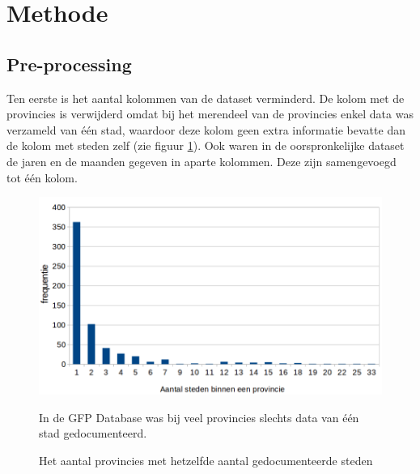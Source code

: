 \documentclass{article}
\begin{document}
\newpage

\section*{Methode}

\subsection*{Pre-processing}
Ten eerste is het aantal kolommen van de dataset verminderd. De kolom met de provincies is verwijderd omdat bij het merendeel van de provincies enkel data was verzameld van één stad, waardoor deze kolom geen extra informatie bevatte dan de kolom met steden zelf (zie figuur \ref{fig_prov}). Ook waren in de oorspronkelijke dataset de jaren en de maanden gegeven in aparte kolommen. Deze zijn samengevoegd tot één kolom.\\

\begin{figure}[h!]
\centering
\includegraphics[scale=0.38]{provincie}
\caption{Het aantal provincies met hetzelfde aantal gedocumenteerde steden}
\label{fig_prov}
\medskip
\small 
In de GFP Database was bij veel provincies slechts data van één stad gedocumenteerd.
 \end{figure}

 
\end{document}

